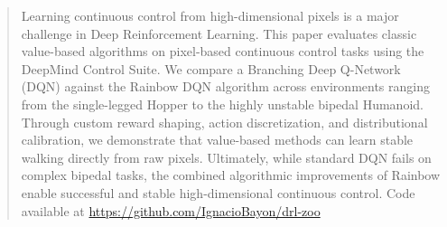 \documentclass{article}
\begin{document}
\setlength{\textfloatsep}{0.15in}

\printAffiliationsAndNotice{}

\begin{abstract}
Learning continuous control from high-dimensional pixels is a major challenge in Deep Reinforcement Learning. This paper evaluates classic value-based algorithms on pixel-based continuous control tasks using the DeepMind Control Suite. We compare a Branching Deep Q-Network (DQN) against the Rainbow DQN algorithm across environments ranging from the single-legged Hopper to the highly unstable bipedal Humanoid. Through custom reward shaping, action discretization, and distributional calibration, we demonstrate that value-based methods can learn stable walking directly from raw pixels. Ultimately, while standard DQN fails on complex bipedal tasks, the combined algorithmic improvements of Rainbow enable successful and stable high-dimensional continuous control.
Code available at \url{https://github.com/IgnacioBayon/drl-zoo}
\end{abstract}









\end{document}
